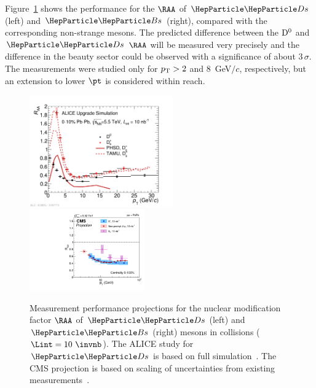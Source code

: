 Figure~\ref{fig:HFDsBs} shows the performance for the $\RAA$ of $\PDs$ (left) and $\PBs$ (right), compared with the corresponding non-strange mesons. The predicted difference between the $\rm D^0$ and $\PDs$ $\RAA$ will be measured very precisely and the difference in the beauty sector could be observed with a significance of about 3\,$\sigma$.
The measurements were studied only for $p_{\rm T}>2$ and 8~GeV$/c$, respectively, but an extension to lower $\pt$ is considered within reach.

\begin{figure}[!t]
\centering
\includegraphics[width=0.55\textwidth]{hf/figures/ALICEUpgrade_D0_Ds_RAA_YR.pdf}
\includegraphics[width=0.44\textwidth]{hf/figures/CMS_B_Bs_RAA.pdf}
\caption{Measurement performance projections for the nuclear modification factor  $\RAA$ of $\PDs$ (left) and $\PBs$ (right) mesons in \PbPb collisions ($\Lint=10~\invnb$). The ALICE study for $\PDs$ is based on full simulation~\cite{Abelev:1625842}. The CMS projection is based on scaling of uncertainties from existing measurements~\cite{CMS-PAS-FTR-17-002}.}
\label{fig:HFDsBs}
\end {figure}

